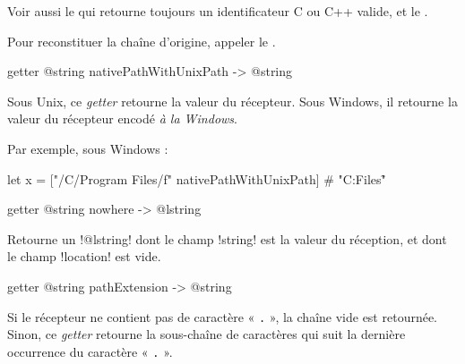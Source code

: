 Voir aussi le  qui retourne toujours un identificateur C ou C++ valide, et le .

Pour reconstituer la chaîne d'origine, appeler le .








\begin{galgas4box}
getter @string nativePathWithUnixPath -> @string
\end{galgas4box}

Sous Unix, ce \emph{getter} retourne la valeur du récepteur. Sous Windows, il retourne la valeur du récepteur encodé \emph{à la Windows}.

Par exemple, sous Windows :
\begin{galgas4}
let x = ["/C/Program Files/f" nativePathWithUnixPath] # "C:\Program Files\f"
\end{galgas4}








\begin{galgas4box}
getter @string nowhere -> @lstring
\end{galgas4box}

Retourne un \ggsq!@lstring! dont le champ \ggsq!string! est la valeur du réception, et dont le champ \ggsq!location! est vide.








\begin{galgas4box}
getter @string pathExtension -> @string
\end{galgas4box}

Si le récepteur ne contient pas de caractère « \texttt{.} », la chaîne vide est retournée. Sinon, ce \emph{getter} retourne la sous-chaîne de caractères qui suit la dernière occurrence du caractère « \texttt{.} ».









